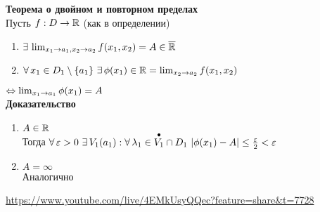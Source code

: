 \documentclass[12pt]{article}
\begin{document}
\textbf{Теорема о двойном и повторном пределах}\\
Пусть $f: D \rightarrow \mathbb{R}$ (как в определении)
\begin{enumerate}
    \item $\exists\, \lim_{x_1\rightarrow a_1, x_2 \rightarrow a_2} f(x_1, x_2) = A \in \overline{\mathbb{R}}$
    \item $\fall x_1 \in D_1\setminus \{a_1\}\ \ex \phi(x_1) \in \Rset = \lim_{x_2 \rto a_2} f(x_1, x_2)$
\end{enumerate}
$\Leftrightarrow \lim_{x_1 \rightarrow a_1} \phi(x_1) = A$\\
\textbf{Доказательство}
\begin{enumerate}
    \item $A \in \mathbb{R}$\\
    Тогда $\forall\, \varepsilon > 0\ \exists\, V_1(a_1): \forall\, \lambda_1 \in \overset{\bullet}{V_1}\cap D_1\ |\phi(x_1) - A| \leq \frac{\varepsilon}2 < \varepsilon$
    \item $A = \infty$\\
    Аналогично
\end{enumerate}
\url{https://www.youtube.com/live/4EMkUsyQQec?feature=share&t=7728}
\end{document}

